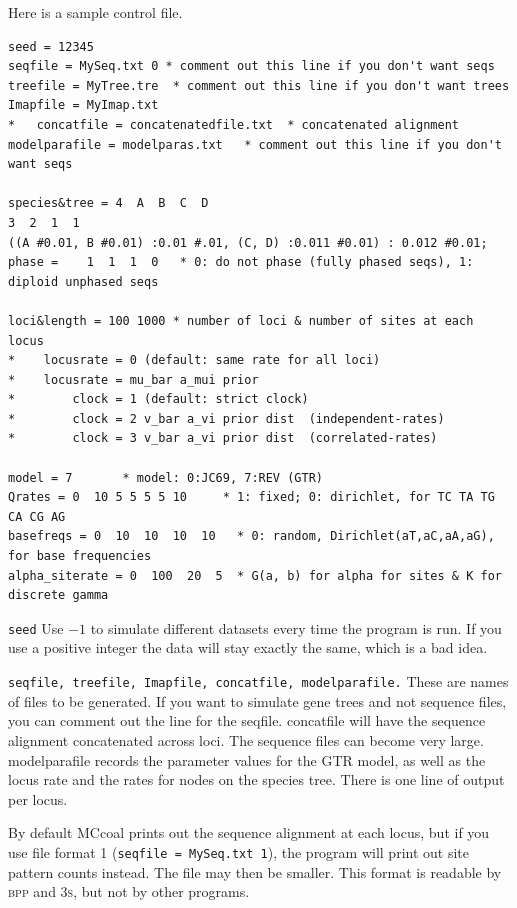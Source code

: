 \documentclass{book}
\numberwithin{equation}{section} \renewcommand{\baselinestretch}{0.55}
\begin{document}
Here is a sample control file.
\begin{verbatim}
seed = 12345
seqfile = MySeq.txt 0 * comment out this line if you don't want seqs
treefile = MyTree.tre  * comment out this line if you don't want trees
Imapfile = MyImap.txt
*   concatfile = concatenatedfile.txt  * concatenated alignment
modelparafile = modelparas.txt   * comment out this line if you don't want seqs

species&tree = 4  A  B  C  D
3  2  1  1
((A #0.01, B #0.01) :0.01 #.01, (C, D) :0.011 #0.01) : 0.012 #0.01;
phase =    1  1  1  0   * 0: do not phase (fully phased seqs), 1: diploid unphased seqs

loci&length = 100 1000 * number of loci & number of sites at each locus
*    locusrate = 0 (default: same rate for all loci)
*    locusrate = mu_bar a_mui prior
*        clock = 1 (default: strict clock)
*        clock = 2 v_bar a_vi prior dist  (independent-rates)
*        clock = 3 v_bar a_vi prior dist  (correlated-rates)

model = 7       * model: 0:JC69, 7:REV (GTR)
Qrates = 0  10 5 5 5 5 10     * 1: fixed; 0: dirichlet, for TC TA TG CA CG AG
basefreqs = 0  10  10  10  10   * 0: random, Dirichlet(aT,aC,aA,aG), for base frequencies
alpha_siterate = 0  100  20  5  * G(a, b) for alpha for sites & K for discrete gamma
\end{verbatim}

\texttt{seed} Use $-1$ to simulate different datasets every time the
program is run.  If you use a positive integer the data will stay
exactly the same, which is a bad idea.

\texttt{seqfile, treefile, Imapfile, concatfile, modelparafile.}
These are names of files to be generated.  If you want to simulate
gene trees and not sequence files, you can comment out the line for
the seqfile.  concatfile will have the sequence alignment concatenated
across loci.  The sequence files can become very large.  modelparafile
records the parameter values for the GTR model, as well as the locus
rate and the rates for nodes on the species tree.  There is one line
of output per locus.

By default MCcoal prints out the sequence alignment at each locus, but
if you use file format 1 (\texttt{seqfile = MySeq.txt 1}), the program
will print out site pattern counts instead. The file may then be
smaller.  This format is readable by \textsc{bpp} and \textsc{3s}, but
not by other programs.
\end{document}
